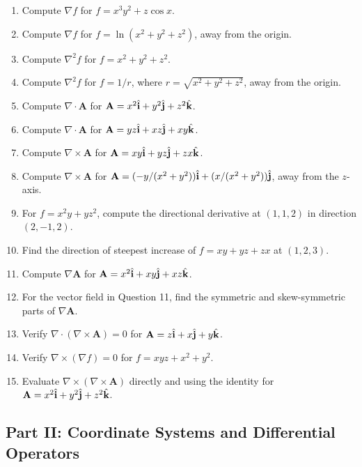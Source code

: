 \documentclass{otscience}
\begin{document}
\begin{practicebox}
\begin{enumerate}
\item Compute \(\nabla f\) for \(f=x^3y^2+z\cos x\).
\item Compute \(\nabla f\) for \(f=\ln(x^2+y^2+z^2)\), away from the origin.
\item Compute \(\nabla^2 f\) for \(f=x^2+y^2+z^2\).
\item Compute \(\nabla^2 f\) for \(f=1/r\), where \(r=\sqrt{x^2+y^2+z^2}\), away from the origin.
\item Compute \(\nabla\cdot\mathbf{A}\) for \(\mathbf{A}=x^2\hat{\mathbf{i}}+y^2\hat{\mathbf{j}}+z^2\hat{\mathbf{k}}\).
\item Compute \(\nabla\cdot\mathbf{A}\) for \(\mathbf{A}=yz\hat{\mathbf{i}}+xz\hat{\mathbf{j}}+xy\hat{\mathbf{k}}\).
\item Compute \(\nabla\times\mathbf{A}\) for \(\mathbf{A}=xy\hat{\mathbf{i}}+yz\hat{\mathbf{j}}+zx\hat{\mathbf{k}}\).
\item Compute \(\nabla\times\mathbf{A}\) for \(\mathbf{A}=(-y/(x^2+y^2))\hat{\mathbf{i}}+(x/(x^2+y^2))\hat{\mathbf{j}}\), away from the \(z\)-axis.
\item For \(f=x^2y+yz^2\), compute the directional derivative at \((1,1,2)\) in direction \((2,-1,2)\).
\item Find the direction of steepest increase of \(f=xy+yz+zx\) at \((1,2,3)\).
\item Compute \(\nabla\mathbf{A}\) for \(\mathbf{A}=x^2\hat{\mathbf{i}}+xy\hat{\mathbf{j}}+xz\hat{\mathbf{k}}\).
\item For the vector field in Question 11, find the symmetric and skew-symmetric parts of \(\nabla\mathbf{A}\).
\item Verify \(\nabla\cdot(\nabla\times\mathbf{A})=0\) for \(\mathbf{A}=z\hat{\mathbf{i}}+x\hat{\mathbf{j}}+y\hat{\mathbf{k}}\).
\item Verify \(\nabla\times(\nabla f)=0\) for \(f=xyz+x^2+y^2\).
\item Evaluate \(\nabla\times(\nabla\times\mathbf{A})\) directly and using the identity for \(\mathbf{A}=x^2\hat{\mathbf{i}}+y^2\hat{\mathbf{j}}+z^2\hat{\mathbf{k}}\).
\end{enumerate}
\end{practicebox}

\subsection{Part II: Coordinate Systems and Differential Operators}
\end{document}
